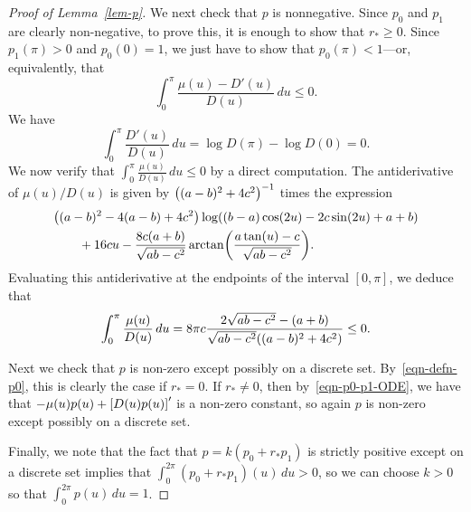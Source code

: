 \documentclass[11pt]{article}
\theoremstyle{plain}
\theoremstyle{definition}
\numberwithin{equation}{section}
\let\originalleft\left
\let\originalright\right
\renewcommand{\left}{\mathopen{}\mathclose\bgroup\originalleft}
\renewcommand{\right}{\aftergroup\egroup\originalright}
\begin{document}
\begin{proof}[Proof of Lemma~\ref{lem-p}]
We next check that $p$ is nonnegative. Since $p_0$ and $p_1$ are clearly non-negative, to prove this, it is enough to show that $r_* \geq 0$.  Since $p_1(\pi) > 0$ and $p_0(0) = 1$, we just have to show that $p_0(\pi) < 1$---or, equivalently, that 
\[ 
\int_0^\pi \frac{\mu(u) - D'(u)}{D(u)} \,du \leq 0.
\]  
We have
\[
\int_0^\pi \frac{D'(u)}{D(u)} \, du = \log{D(\pi)} - \log{D(0)} = 0.
\]
We now verify that $\int_0^\pi \frac{\mu(u)}{D(u)} \,du \leq 0$ by 
a direct computation.  The antiderivative of $\mu(u)/D(u)$ is given by $\left((a-b)^2+4 c^2\right)^{-1}$ times the expression
\begin{align*} 
&\left( (a-b)^2 -4 (a-b) +4 c^2\right) \log ((b-a) \cos (2 u)-2 c \sin (2 u)+a+b) \\
&\qquad +16 c u - \frac{8 c (a+b)}{\sqrt{ab-c^2}} \arctan\left(\frac{a \tan
   (u)-c}{\sqrt{ab-c^2}}\right).
   \end{align*}
Evaluating this antiderivative at the endpoints of the interval $[0,\pi]$, we deduce that
\[
\int_0^\pi \frac{\mu(u)}{D(u)}  \,du  = 
8\pi c \frac{2 \sqrt{a b-c^2}- (a+b)}{\sqrt{a b-c^2} \left((a-b)^2+4 c^2\right)} \leq 0.
\] 

Next we check that $p$ is non-zero except possibly on a discrete set. By~\eqref{eqn-defn-p0}, this is clearly the case if $r_* = 0$. If $r_*\not=0$, then by~\eqref{eqn-p0-p1-ODE}, we have that $ -\mu(u) p (u) +  \left[ D(u) p (u) \right]'$ is a non-zero constant, so again $p$ is non-zero except possibly on a discrete set. %

Finally, we note that the fact that $p = k(p_0 + r_* p_1)$ is strictly positive except on a discrete set implies that $\int_0^{2\pi} (p_0 + r_* p_1)(u) \,du > 0$, so we can choose $k > 0$ so that $\int_0^{2\pi} p(u) \,du = 1$. 
\medskip


\end{proof}
\end{document}
